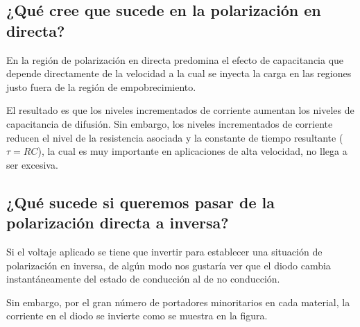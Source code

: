 \subsection{¿Qué cree que sucede en la polarización en directa?}

En la región de polarización en directa predomina el efecto de capacitancia que depende directamente de la velocidad a la cual se inyecta la carga en las regiones justo fuera de la región de empobrecimiento.

El resultado es que los niveles incrementados de corriente aumentan los niveles de capacitancia de difusión. Sin embargo, los niveles incrementados de corriente reducen el nivel de la resistencia asociada y la constante de tiempo resultante ($\tau = RC$), la cual es muy importante en aplicaciones de alta velocidad, no llega a ser excesiva.

\subsection{¿Qué sucede si queremos pasar de la polarización directa a inversa?}

Si el voltaje aplicado se tiene que invertir para establecer una situación de polarización en inversa, de algún modo nos gustaría ver que el diodo cambia instantáneamente del estado de conducción al de no conducción.

Sin embargo, por el gran número de portadores minoritarios en cada material, la corriente en el diodo se invierte como se muestra en la figura.


